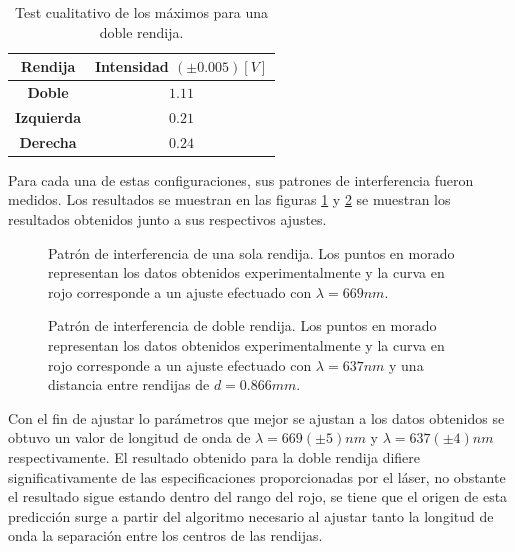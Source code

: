 \documentclass[%
 reprint,
 amsmath,amssymb,
 aps,
]{revtex4-1}
\begin{document}
{\begin{table}[h]
\begin{tabular}{c|c}
\textbf{Rendija} & \multicolumn{1}{l}{\textbf{Intensidad $(\pm 0.005)[V]$}} \\ \hline\hline
\textbf{Doble} & $1.11$ \\
\textbf{Izquierda} & $0.21$ \\
\textbf{Derecha} & $0.24$
\end{tabular}
\caption{Test cualitativo de los máximos para una doble rendija.}
\label{comparacion_tabla}
\end{table}

Para cada una de estas configuraciones, sus patrones de interferencia fueron medidos. Los resultados se muestran en las figuras \ref{patron_de_una} y \ref{patron_de_dos} se muestran los resultados obtenidos junto a sus respectivos ajustes.

\begin{figure}[ht]
\caption{\label{patron_de_una}Patrón de interferencia de una sola rendija. Los puntos en morado representan los datos obtenidos experimentalmente y la curva en rojo corresponde a un ajuste efectuado con $\lambda=669nm$.}
\end{figure}

\begin{figure}[h]
\caption{\label{patron_de_dos}Patrón de interferencia de doble rendija. Los puntos en morado representan los datos obtenidos experimentalmente y la curva en rojo corresponde a un ajuste efectuado con $\lambda=637nm$ y una distancia entre rendijas de $d=0.866mm$.}
\end{figure}
 Con el fin de ajustar lo parámetros que mejor se ajustan a los datos obtenidos se obtuvo un valor de longitud de onda de  $\lambda=669(\pm 5) nm$ y $\lambda=637(\pm 4) nm$ respectivamente. El resultado obtenido para la doble rendija difiere significativamente de las especificaciones proporcionadas por el láser, no obstante el resultado sigue estando dentro del rango del rojo, se tiene que el origen de esta predicción surge a partir del algoritmo necesario al ajustar tanto la longitud de onda la separación entre los centros de las rendijas.
}
\end{document}
